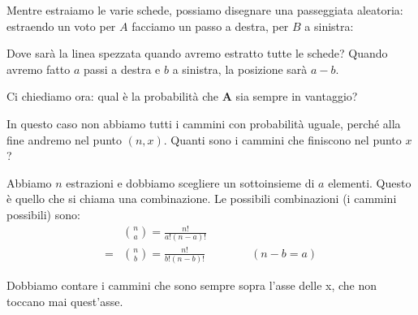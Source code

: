 \documentclass[a4paper,12pt]{book}
\begin{document}
Mentre estraiamo le varie schede, possiamo disegnare una passeggiata aleatoria: estraendo un voto per $ A $ facciamo un passo a destra, per $ B $ a sinistra:
\begin{center}
\end{center}

Dove sarà la linea spezzata quando avremo estratto tutte le schede? Quando avremo fatto $ a $ passi a destra e $ b $ a sinistra, la posizione sarà $ a-b $. 

Ci chiediamo ora: qual è la probabilità che \textbf{A} sia sempre in vantaggio?

In questo caso non abbiamo tutti i cammini con probabilità uguale, perché alla fine andremo nel punto $ (n,x) $. Quanti sono i cammini che finiscono nel punto $ x $?

Abbiamo $ n $ estrazioni e dobbiamo scegliere un sottoinsieme di $ a $ elementi. Questo è quello che si chiama una combinazione. Le possibili combinazioni (i cammini possibili) sono:
\begin{align*}
	& \binom{n}{a} = \frac{n!}{a!(n-a)!} \\
    = & \binom{n}{b} = \frac{n!}{b!(n-b)!} \qquad \qquad (n-b=a)
\end{align*}

Dobbiamo contare i cammini che sono sempre sopra l'asse delle x, che non toccano mai quest'asse. 
\end{document}
